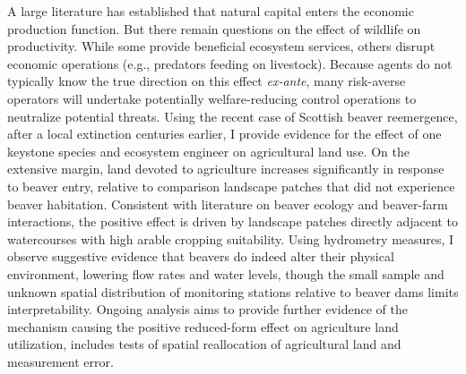 A large literature has established that natural capital enters the economic production function. But there remain questions on the effect of wildlife on productivity. While some provide beneficial ecosystem services, others disrupt economic operations (e.g., predators feeding on livestock). Because agents do not typically know the true direction on this effect \textit{ex-ante}, many risk-averse operators will undertake potentially welfare-reducing control operations to neutralize potential threats. Using the recent case of Scottish beaver reemergence, after a local extinction centuries earlier, I provide evidence for the effect of one keystone species and ecosystem engineer on agricultural land use. On the extensive margin, land devoted to agriculture increases significantly in response to beaver entry, relative to comparison landscape patches that did not experience beaver habitation. Consistent with literature on beaver ecology and beaver-farm interactions, the positive effect is driven by landscape patches directly adjacent to watercourses with high arable cropping suitability. Using hydrometry measures, I observe suggestive evidence that beavers do indeed alter their physical environment, lowering flow rates and water levels, though the small sample and unknown spatial distribution of monitoring stations relative to beaver dams limits interpretability. Ongoing analysis aims to provide further evidence of the mechanism causing the positive reduced-form effect on agriculture land utilization, includes tests of spatial reallocation of agricultural land and measurement error. 